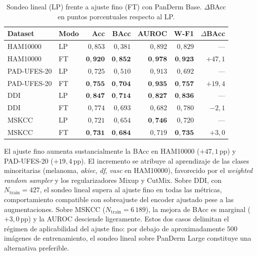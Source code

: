 \begin{table}[H]
\centering
\footnotesize
\setlength{\tabcolsep}{4pt}
\renewcommand{\arraystretch}{0.95}
\caption{Sondeo lineal (LP) frente a ajuste fino (FT) con PanDerm
Base. $\Delta$BAcc en puntos porcentuales respecto al LP.}
\label{tab:ft-panderm}
\begin{tabular}{llrrrrr}
\hline
Dataset      & Modo & Acc           & BAcc          & AUROC         & W-F1          & $\Delta$BAcc \\
\hline
HAM10000     & LP   & $0{,}853$     & $0{,}381$     & $0{,}892$     & $0{,}829$     & --- \\
HAM10000     & FT   & $\mathbf{0{,}920}$ & $\mathbf{0{,}852}$ & $\mathbf{0{,}978}$ & $\mathbf{0{,}923}$ & $+47{,}1$ \\
PAD-UFES-20  & LP   & $0{,}725$     & $0{,}510$     & $0{,}913$     & $0{,}692$     & --- \\
PAD-UFES-20  & FT   & $\mathbf{0{,}755}$ & $\mathbf{0{,}704}$ & $\mathbf{0{,}935}$ & $\mathbf{0{,}757}$ & $+19{,}4$ \\
DDI          & LP   & $\mathbf{0{,}847}$ & $\mathbf{0{,}714}$ & $\mathbf{0{,}827}$ & $\mathbf{0{,}836}$ & --- \\
DDI          & FT   & $0{,}774$     & $0{,}693$     & $0{,}682$     & $0{,}780$     & $-2{,}1$ \\
MSKCC        & LP   & $0{,}721$     & $0{,}654$     & $\mathbf{0{,}746}$ & $0{,}720$     & --- \\
MSKCC        & FT   & $\mathbf{0{,}731}$ & $\mathbf{0{,}684}$ & $0{,}719$     & $\mathbf{0{,}735}$ & $+3{,}0$ \\
\hline
\end{tabular}
\end{table}

El ajuste fino aumenta sustancialmente la BAcc en HAM10000
($+47{,}1$\,pp) y PAD-UFES-20 ($+19{,}4$\,pp). El incremento se
atribuye al aprendizaje de las clases minoritarias (melanoma,
\emph{akiec}, \emph{df}, \emph{vasc} en HAM10000), favorecido por
el \emph{weighted random sampler} y los regularizadores Mixup y
CutMix. Sobre DDI, con $N_{\mathrm{train}} = 427$, el sondeo lineal
supera al ajuste fino en todas las métricas, comportamiento
compatible con sobreajuste del encoder ajustado pese a las
augmentaciones. Sobre MSKCC ($N_{\mathrm{train}} = 6\,189$), la
mejora de BAcc es marginal ($+3{,}0$\,pp) y la AUROC desciende
ligeramente. Estos dos casos delimitan el régimen de aplicabilidad
del ajuste fino: por debajo de aproximadamente $500$ imágenes
de entrenamiento, el sondeo lineal sobre PanDerm Large constituye
una alternativa preferible.


